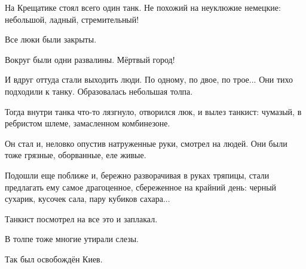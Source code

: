 На Крещатике стоял всего один танк. Не похожий на неуклюжие немецкие:
небольшой, ладный, стремительный!

Все люки были закрыты.

Вокруг были одни развалины. Мёртвый город!

И вдруг оттуда стали выходить люди. По одному, по двое, по трое... Они тихо
подходили к танку. Образовалась небольшая толпа.

Тогда внутри танка что-то лязгнуло, отворился люк, и вылез танкист: чумазый, в
ребристом шлеме, замасленном комбинезоне.

Он стал и, неловко опустив натруженные руки, смотрел на людей. Они были тоже
грязные, оборванные, еле живые.

Подошли еще поближе и, бережно разворачивая в руках тряпицы, стали предлагать
ему самое драгоценное, сбереженное на крайний день: черный сухарик, кусочек
сала, пару кубиков сахара...

Танкист посмотрел на все это и заплакал.

В толпе тоже многие утирали слезы.

Так был освобождён Киев.

